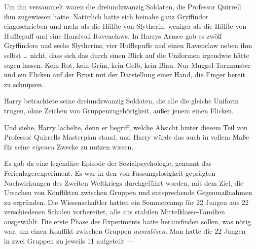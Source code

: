 Um ihn versammelt waren die dreiundzwanzig Soldaten, die Professor Quirrell ihm zugewiesen hatte. Natürlich hatte sich beinahe ganz Gryffindor eingeschrieben und mehr als die Hälfte von Slytherin, weniger als die Hälfte von Hufflepuff und eine Handvoll Ravenclaws. In Harrys Armee gab es zwölf Gryffindors und sechs Slytherins, vier Hufflepuffs und einen Ravenclaw neben ihm selbst … nicht, dass sich das durch einen Blick auf die Uniformen irgendwie hätte sagen lassen. Kein Rot, kein Grün, kein Gelb, kein Blau. Nur Muggel-Tarnmuster und ein Flicken auf der Brust mit der Darstellung einer Hand, die Finger bereit zu schnipsen.

Harry betrachtete seine dreiundzwanzig Soldaten, die alle die gleiche Uniform trugen, ohne Zeichen von Gruppenzugehörigkeit, außer jenem einen Flicken.

Und siehe, Harry lächelte, denn er begriff, welche Absicht hinter diesem Teil von Professor Quirrells Masterplan stand, und Harry würde das auch in vollem Maße für seine \emph{eigenen} Zwecke zu nutzen wissen.

Es gab da eine legendäre Episode der Sozialpsychologie, genannt das Ferienlagerexperiment. Es war in den von Fassungslosigkeit geprägten Nachwirkungen des Zweiten Weltkriegs durchgeführt worden, mit dem Ziel, die Ursachen von Konflikten zwischen Gruppen und entsprechende Gegenmaßnahmen zu ergründen. Die Wissenschaftler hatten ein Sommercamp für 22 Jungen aus 22 verschiedenen Schulen vorbereitet, alle aus stabilen Mittelklasse-Familien ausgewählt. Die erste Phase des Experiments hatte herausfinden sollen, was nötig war, um einen Konflikt zwischen Gruppen \emph{auszulösen}. Man hatte die 22 Jungen in zwei Gruppen zu jeweils 11 aufgeteilt —

